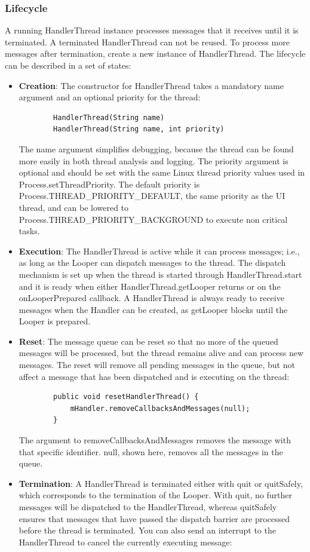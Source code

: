 \subsubsection{Lifecycle}
A running HandlerThread instance processes messages that it receives until it is terminated. A terminated HandlerThread can not be reused. To process more messages after termination, create a new instance of HandlerThread. The lifecycle can be described in a set of states:
\begin{itemize}
	\item \textbf{Creation}: The constructor for HandlerThread takes a mandatory name argument and an optional priority for the thread:
	\begin{lstlisting}
		HandlerThread(String name)
		HandlerThread(String name, int priority)
	\end{lstlisting}
	The name argument simplifies debugging, because the thread can be found more easily in both thread analysis and logging. The priority argument is optional and should be set with the same Linux thread priority values used in Process.setThreadPriority. The default priority is Process.THREAD\_PRIORITY\_DEFAULT, the same priority as the UI thread, and can be lowered to Process.THREAD\_PRIORITY\_BACKGROUND to execute non critical tasks.
	\item \textbf{Execution}: The HandlerThread is active while it can process messages; i.e., as long as the Looper can dispatch messages to the thread. The dispatch mechanism is set up when the thread is started through HandlerThread.start and it is ready when either HandlerThread.getLooper returns or on the onLooperPrepared callback. A HandlerThread is always ready to receive messages when the Handler can be created, as getLooper blocks until the Looper is prepared.
	\item \textbf{Reset}: The message queue can be reset so that no more of the queued messages will be processed, but the thread remains alive and can process new messages. The reset will remove all pending messages in the queue, but not affect a message that has been dispatched and is executing on the thread:
	\begin{lstlisting}
		public void resetHandlerThread() {
			mHandler.removeCallbacksAndMessages(null);
		}
	\end{lstlisting}
	The argument to removeCallbacksAndMessages removes the message with that specific identifier. null, shown here, removes all the messages in the queue.
	\item \textbf{Termination}: A HandlerThread is terminated either with quit or quitSafely, which corresponds to the termination of the Looper. With quit, no further messages will be dispatched to the HandlerThread, whereas quitSafely ensures that messages that have passed the dispatch barrier are processed before the thread is terminated. You can also send an interrupt to the HandlerThread to cancel the currently executing message:

\end{itemize}
